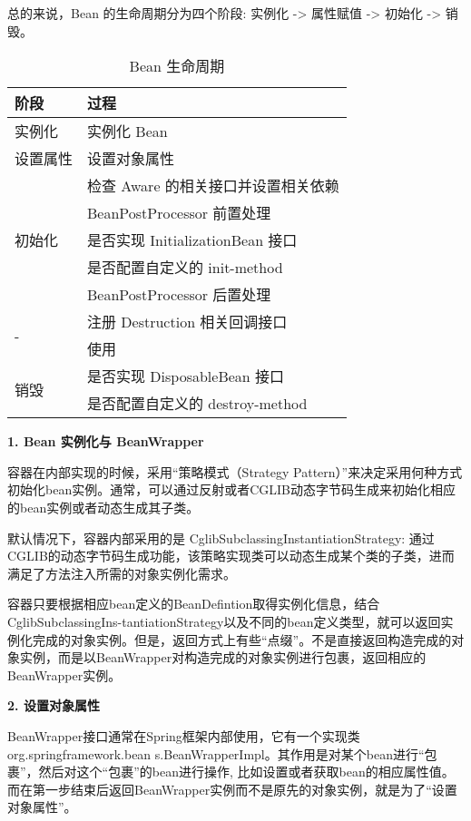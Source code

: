 总的来说，Bean 的生命周期分为四个阶段: 实例化 -> 属性赋值 -> 初始化 -> 销毁。

\begin{table}[H]
    \small
    \centering
    \caption{Bean 生命周期}
    \label{table:Bean 生命周期}
    \setlength{\tabcolsep}{4mm}
    \begin{tabular}{l|l}
        \toprule
        \textbf{阶段} & \textbf{过程} \\
        \midrule
        实例化 & 实例化 Bean \\
        \midrule
        设置属性 & 设置对象属性 \\
        \midrule
        \multirow{5}{*}{初始化} & 检查 Aware 的相关接口并设置相关依赖 \\
         & BeanPostProcessor 前置处理 \\
         & 是否实现 InitializationBean 接口 \\
         & 是否配置自定义的 init-method \\
         & BeanPostProcessor 后置处理 \\
        \midrule
        \multirow{2}{*}{-} & 注册 Destruction 相关回调接口 \\
         & 使用 \\
        \midrule
        \multirow{2}{*}{销毁} & 是否实现 DisposableBean 接口 \\
         & 是否配置自定义的 destroy-method \\
        \bottomrule
    \end{tabular}
\end{table}


\noindent\textbf{1. Bean 实例化与 BeanWrapper}

容器在内部实现的时候，采用“策略模式（Strategy Pattern）”来决定采用何种方式初始化bean实例。通常，可以通过反射或者CGLIB动态字节码生成来初始化相应的bean实例或者动态生成其子类。

默认情况下，容器内部采用的是 CglibSubclassingInstantiationStrategy: 通过CGLIB的动态字节码生成功能，该策略实现类可以动态生成某个类的子类，进而满足了方法注入所需的对象实例化需求。

容器只要根据相应bean定义的BeanDefintion取得实例化信息，结合CglibSubclassingIns-tantiationStrategy以及不同的bean定义类型，就可以返回实例化完成的对象实例。但是，返回方式上有些“点缀”。不是直接返回构造完成的对象实例，而是以BeanWrapper对构造完成的对象实例进行包裹，返回相应的BeanWrapper实例。

\noindent\textbf{2. 设置对象属性}

BeanWrapper接口通常在Spring框架内部使用，它有一个实现类 org.springframework.bean s.BeanWrapperImpl。其作用是对某个bean进行“包裹”，然后对这个“包裹”的bean进行操作, 比如设置或者获取bean的相应属性值。而在第一步结束后返回BeanWrapper实例而不是原先的对象实例，就是为了“设置对象属性”。

